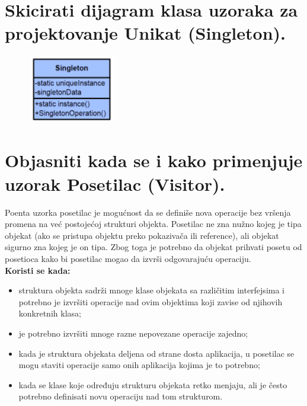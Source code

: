 \documentclass[a4paper]{article}
\begin{document}
\section{Skicirati dijagram klasa uzoraka za projektovanje Unikat (Singleton).}
  \begin{figure}[H]
    \begin{center}
        \includegraphics[width=40mm,height=30mm]{Slike/dp_singleton.png}
    \end{center}
  \end{figure}  

\section{Objasniti kada se i kako primenjuje uzorak Posetilac (Visitor).}
  Poenta uzorka posetilac je mogućnost da se definiše nova operacije bez vršenja promena na
  već postojećoj strukturi objekta. Posetilac ne zna nužno kojeg je tipa objekat (ako se 
  pristupa objektu preko pokazivača ili reference), ali objekat sigurno zna kojeg je on tipa. Zbog toga je potrebno
  da objekat prihvati posetu od posetioca kako bi posetilac mogao da izvrši odgovarajuću operaciju.\\
  \textbf{Koristi se kada:}
  \begin{itemize}
    \item struktura objekta sadrži mnoge klase objekata sa različitim interfejsima i potrebno 
          je izvršiti operacije nad ovim objektima koji zavise od njihovih konkretnih klasa;
    \item je potrebno izvršiti mnoge razne nepovezane operacije zajedno;
    \item kada je struktura objekata deljena od strane dosta aplikacija, u posetilac se mogu
          staviti operacije samo onih aplikacija kojima je to potrebno;
    \item kada se klase koje određuju strukturu objekata retko menjaju, ali je često potrebno
          definisati novu operaciju nad tom strukturom.
  \end{itemize}
\end{document}
